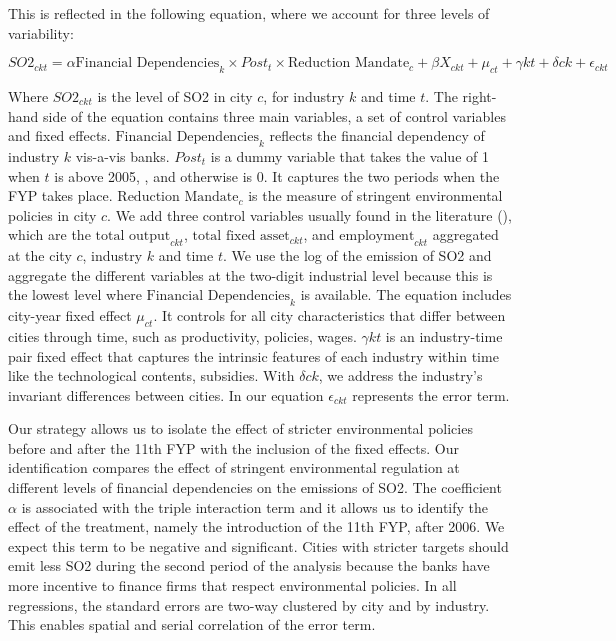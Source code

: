 \documentclass[12pt]{article}
\begin{document}
This is reflected in the following equation, where we account for three levels of variability: 

\begin{equation} \label{eq:main}
SO2_{ckt} = \alpha\text{Financial Dependencies}_{k} \times Post_{t} \times \text{Reduction Mandate}_{c} + \beta X_{ckt} + \mu_{ct} + \gamma{kt} + \delta{ck} + \epsilon_{ckt}
\end{equation}

Where $SO2_{ckt}$ is the level of SO2 in city $c$, for industry $k$ and time $t$. The right-hand side of the equation contains three main variables, a set of control variables and fixed effects. $\text{Financial Dependencies}_{k}$ reflects the financial dependency of industry $k$ vis-a-vis banks. $Post_t$ is a dummy variable that takes the value of 1 when $t$ is above 2005, , and otherwise is 0. It captures the two periods when the FYP takes place. $\text{Reduction Mandate}_{c}$ is the measure of stringent environmental policies in city $c$. We add three control variables usually found in the literature (\cite{Andersen2015-pa, Andersen2017-wf}), which are the $\text{total output}_{ckt}$, $\text{total fixed asset}_{ckt}$, and $\text{employment}_{ckt}$ aggregated at the city $c$, industry $k$ and time $t$. We use the log of the emission of SO2 and aggregate the different variables at the two-digit industrial level because this is the lowest level where $\text{Financial Dependencies}_{k}$ is available. The equation includes city-year fixed effect $\mu_{ct}$. It controls for all city characteristics that differ between cities through time, such as productivity, policies, wages. $\gamma{kt}$ is an industry-time pair fixed effect that captures the intrinsic features of each industry within time like the technological contents, subsidies. With $\delta{ck}$, we address the industry's invariant differences between cities. In our equation $\epsilon_{ckt}$ represents the error term.

Our strategy allows us to isolate the effect of stricter environmental policies before and after the 11th FYP with the inclusion of the fixed effects. Our identification compares the effect of stringent environmental regulation at different levels of financial dependencies on the emissions of SO2. The coefficient $\alpha$ is associated with the triple interaction term and it allows us to identify the effect of the treatment, namely the introduction of the 11th FYP, after 2006. We expect this term to be negative and significant. Cities with stricter targets should emit less SO2 during the second period of the analysis because the banks have more incentive to finance firms that respect environmental policies. In all regressions, the standard errors are two-way clustered by city and by industry. This enables spatial and serial correlation of the error term.
\end{document}
